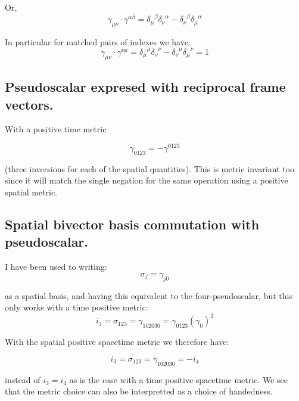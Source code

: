 \documentclass{article}
\begin{document}
Or,
\begin{equation}
\gamma_{\mu\nu} \cdot \gamma^{\alpha\beta} = {\delta_{\mu}}^{\beta} {\delta_{\nu}}^{\alpha} - {\delta_{\nu}}^{\beta} {\delta_{\mu}}^{\alpha}
\end{equation}

In particular for matched pairs of indexes we have:
\begin{equation*}
\gamma_{\mu\nu} \cdot \gamma^{\nu\mu} = {\delta_{\mu}}^{\mu} {\delta_{\nu}}^{\nu} - {\delta_{\nu}}^{\mu} {\delta_{\mu}}^{\nu} = 1
\end{equation*}

\subsection{ Pseudoscalar expresed with reciprocal frame vectors. }

With a positive time metric

\begin{equation*}
\gamma_{0123} = -\gamma^{0123}
\end{equation*}

(three inversions for each of the spatial quantities).  This is metric invariant too since it will match the single negation for the same operation
using a positive spatial metric.

\subsection{ Spatial bivector basis commutation with pseudoscalar. }

I have been used to writing:
\begin{equation*}
\sigma_j = \gamma_{j0}
\end{equation*}

as a spatial basis, and having this equivalent to the four-pseudoscalar, but this only works with a time positive metric:
\begin{equation*}
i_3 = \sigma_{123} = \gamma_{102030} = \gamma_{0123} (\gamma_0)^2
\end{equation*}

With the spatial positive spacetime metric we therefore have:

\begin{equation*}
i_3 = \sigma_{123} = \gamma_{102030} = -i_4
\end{equation*}

instead of $i_3 = i_4$ as is the case with a time positive spacetime metric.  We see that the metric choice can also be interpretted as a choice of handedness.
\end{document}
